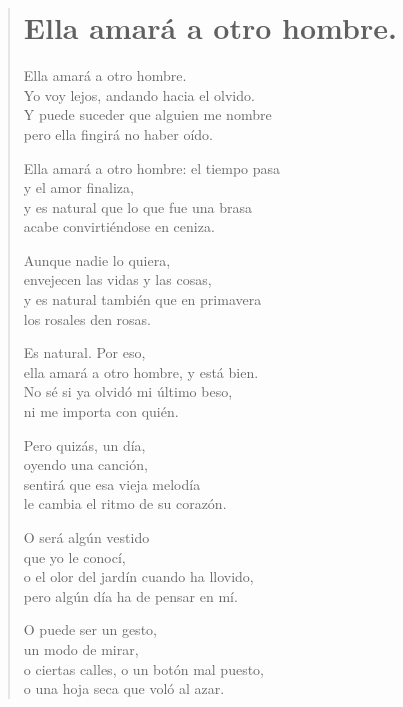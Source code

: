 \documentclass[11pt, portrait, twoside, notitlepage, openright]{book}
\begin{document}
\newpage
\begin{verse}
\begin{center}
\section{Ella amará a otro hombre.}
\end{center}
Ella amará a otro hombre.\\
Yo voy lejos, andando hacia el olvido.\\
Y puede suceder que alguien me nombre\\
pero ella fingirá no haber oído.
\newline

Ella amará a otro hombre: el tiempo pasa\\
y el amor finaliza,\\
y es natural que lo que fue una brasa\\
acabe convirtiéndose en ceniza.
\newline

Aunque nadie lo quiera,\\
envejecen las vidas y las cosas,\\
y es natural también que en primavera\\
los rosales den rosas.
\newline

Es natural. Por eso,\\
ella amará a otro hombre, y está bien.\\
No sé si ya olvidó mi último beso,\\
ni me importa con quién.
\newline

Pero quizás, un día,\\
oyendo una canción,\\
sentirá que esa vieja melodía\\
le cambia el ritmo de su corazón.
\newpage

O será algún vestido\\
que yo le conocí,\\
o el olor del jardín cuando ha llovido,\\
pero algún día ha de pensar en mí.
\newline

O puede ser un gesto,\\
un modo de mirar,\\
o ciertas calles, o un botón mal puesto,\\
o una hoja seca que voló al azar.
\newline


\end{verse}
\end{document}
